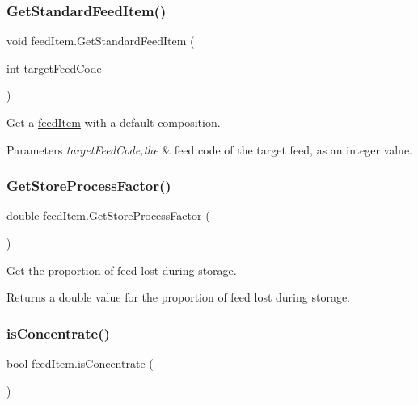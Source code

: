 \subsubsection{\texorpdfstring{GetStandardFeedItem()}{GetStandardFeedItem()}}
{\footnotesize\ttfamily void feed\+Item.\+Get\+Standard\+Feed\+Item (\begin{DoxyParamCaption}\item[{int}]{target\+Feed\+Code }\end{DoxyParamCaption})\hspace{0.3cm}{\ttfamily [inline]}}



Get a \mbox{\hyperlink{classfeed_item}{feed\+Item}} with a default composition. 


\begin{DoxyParams}{Parameters}
{\em target\+Feed\+Code,the} & feed code of the target feed, as an integer value. \\
\hline
\end{DoxyParams}
\mbox{\label{classfeed_item_a86efcd61f525edf159c12193e1cf4f91}} 
\subsubsection{\texorpdfstring{GetStoreProcessFactor()}{GetStoreProcessFactor()}}
{\footnotesize\ttfamily double feed\+Item.\+Get\+Store\+Process\+Factor (\begin{DoxyParamCaption}{ }\end{DoxyParamCaption})\hspace{0.3cm}{\ttfamily [inline]}}



Get the proportion of feed lost during storage. 

\begin{DoxyReturn}{Returns}
a double value for the proportion of feed lost during storage. 
\end{DoxyReturn}
\mbox{\label{classfeed_item_a6c014cb057ccf54655d47d29d10101c9}} 
\subsubsection{\texorpdfstring{isConcentrate()}{isConcentrate()}}
{\footnotesize\ttfamily bool feed\+Item.\+is\+Concentrate (\begin{DoxyParamCaption}{ }\end{DoxyParamCaption})\hspace{0.3cm}{\ttfamily [inline]}}



